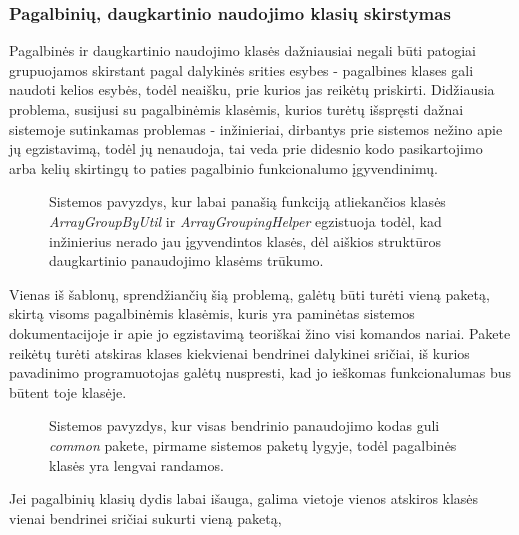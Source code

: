 \subsubsection{Pagalbinių, daugkartinio naudojimo klasių skirstymas}
Pagalbinės ir daugkartinio naudojimo klasės dažniausiai negali būti patogiai grupuojamos skirstant pagal dalykinės srities esybes - pagalbines klases gali
naudoti kelios esybės, todėl neaišku, prie kurios jas reikėtų priskirti.
Didžiausia problema, susijusi su pagalbinėmis klasėmis, kurios turėtų išspręsti dažnai sistemoje sutinkamas problemas -
inžinieriai, dirbantys prie sistemos nežino apie jų egzistavimą, todėl jų nenaudoja,
tai veda prie didesnio kodo pasikartojimo arba kelių skirtingų to paties pagalbinio funkcionalumo įgyvendinimų.
\begin{figure}[H]
\snugshade
{}
\endsnugshade
\caption{Sistemos pavyzdys, kur labai panašią funkciją atliekančios klasės \textit{ArrayGroupByUtil} ir \textit{ArrayGroupingHelper}
egzistuoja todėl, kad inžinierius nerado jau įgyvendintos klasės, dėl aiškios struktūros daugkartinio
panaudojimo klasėms trūkumo.}
\end{figure}
Vienas iš šablonų, sprendžiančių šią problemą, galėtų būti turėti vieną paketą, skirtą visoms pagalbinėmis klasėmis, kuris yra paminėtas sistemos
dokumentacijoje ir apie jo egzistavimą teoriškai žino visi komandos nariai.
Pakete reikėtų turėti atskiras klases kiekvienai bendrinei dalykinei sričiai, iš kurios pavadinimo programuotojas galėtų nuspresti,
kad jo ieškomas funkcionalumas bus būtent toje klasėje.
\begin{figure}[H]
\snugshade
{}
\endsnugshade
\caption{Sistemos pavyzdys, kur visas bendrinio panaudojimo kodas guli \textit{common} pakete, pirmame sistemos paketų lygyje, todėl
pagalbinės klasės yra lengvai randamos.}
\end{figure}
Jei pagalbinių klasių dydis labai išauga, galima vietoje vienos atskiros klasės vienai bendrinei sričiai sukurti vieną paketą,
